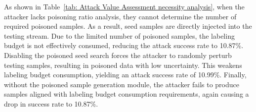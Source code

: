 \documentclass[lettersize,journal]{IEEEtran}
\newcommand{\pandora}{{\scshape Pandora}\xspace}
\begin{document}
As shown in Table~\ref{tab: Attack Value Assessment necessity analysis}, when the attacker lacks poisoning ratio analysis, they cannot determine the number of required poisoned samples.
As a result, seed samples are directly injected into the testing stream.
Due to the limited number of poisoned samples, the labeling budget is not effectively consumed, reducing the attack success rate to 10.87\%.
Disabling the poisoned seed search forces the attacker to randomly perturb testing samples, resulting in poisoned data with low uncertainty.
This weakens labeling budget consumption, yielding an attack success rate of 10.99\%.
Finally, without the poisoned sample generation module, the attacker fails to produce samples aligned with labeling budget consumption requirements, again causing a drop in success rate to 10.87\%.
\end{document}

